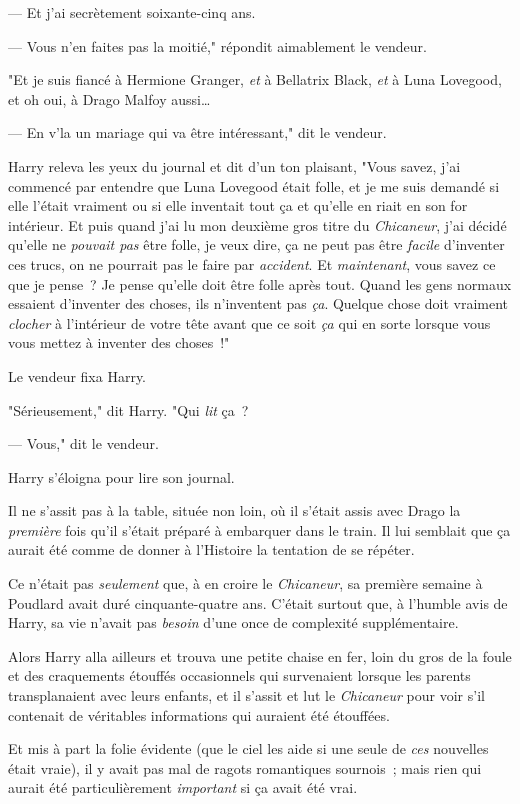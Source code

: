--- Et j'ai secrètement soixante-cinq ans.

--- Vous n'en faites pas la moitié," répondit aimablement le vendeur.

"Et je suis fiancé à Hermione Granger, \emph{et} à Bellatrix Black, \emph{et} à Luna Lovegood, et oh oui, à Drago Malfoy aussi…

--- En v'la un mariage qui va être intéressant," dit le vendeur.

Harry releva les yeux du journal et dit d'un ton plaisant, "Vous savez, j'ai commencé par entendre que Luna Lovegood était folle, et je me suis demandé si elle l'était vraiment ou si elle inventait tout ça et qu'elle en riait en son for intérieur. Et puis quand j'ai lu mon deuxième gros titre du \emph{Chicaneur}, j'ai décidé qu'elle ne \emph{pouvait pas} être folle, je veux dire, ça ne peut pas être \emph{facile} d'inventer ces trucs, on ne pourrait pas le faire par \emph{accident}. Et \emph{maintenant}, vous savez ce que je pense~? Je pense qu'elle doit être folle après tout. Quand les gens normaux essaient d'inventer des choses, ils n'inventent pas \emph{ça}. Quelque chose doit vraiment \emph{clocher} à l'intérieur de votre tête avant que ce soit \emph{ça} qui en sorte lorsque vous vous mettez à inventer des choses~!"

Le vendeur fixa Harry.

"Sérieusement," dit Harry. "Qui \emph{lit} ça~?

--- Vous," dit le vendeur.

Harry s'éloigna pour lire son journal.

Il ne s'assit pas à la table, située non loin, où il s'était assis avec Drago la \emph{première} fois qu'il s'était préparé à embarquer dans le train. Il lui semblait que ça aurait été comme de donner à l'Histoire la tentation de se répéter.

Ce n'était pas \emph{seulement} que, à en croire le \emph{Chicaneur}, sa première semaine à Poudlard avait duré cinquante-quatre ans. C'était surtout que, à l'humble avis de Harry, sa vie n'avait pas \emph{besoin} d'une once de complexité supplémentaire.

Alors Harry alla ailleurs et trouva une petite chaise en fer, loin du gros de la foule et des craquements étouffés occasionnels qui survenaient lorsque les parents transplanaient avec leurs enfants, et il s'assit et lut le \emph{Chicaneur} pour voir s'il contenait de véritables informations qui auraient été étouffées.

Et mis à part la folie évidente (que le ciel les aide si une seule de \emph{ces} nouvelles était vraie), il y avait pas mal de ragots romantiques sournois~; mais rien qui aurait été particulièrement \emph{important} si ça avait été vrai.

